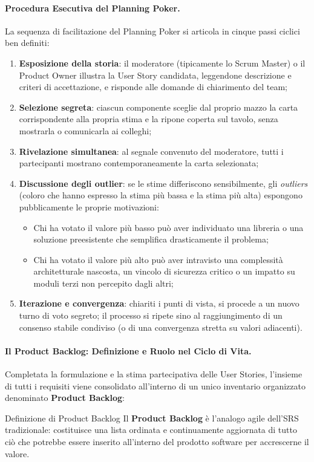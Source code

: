 \documentclass[12pt]{extarticle}
\begin{document}
\paragraph{Procedura Esecutiva del Planning Poker.}
La sequenza di facilitazione del Planning Poker si articola in cinque passi ciclici ben definiti:
\begin{enumerate}
    \item \textbf{Esposizione della storia}: il moderatore (tipicamente lo Scrum Master) o il Product Owner illustra la User Story candidata, leggendone descrizione e criteri di accettazione, e risponde alle domande di chiarimento del team;
    \item \textbf{Selezione segreta}: ciascun componente sceglie dal proprio mazzo la carta corrispondente alla propria stima e la ripone coperta sul tavolo, senza mostrarla o comunicarla ai colleghi;
    \item \textbf{Rivelazione simultanea}: al segnale convenuto del moderatore, tutti i partecipanti mostrano contemporaneamente la carta selezionata;
    \item \textbf{Discussione degli outlier}: se le stime differiscono sensibilmente, gli \textit{outliers} (coloro che hanno espresso la stima più bassa e la stima più alta) espongono pubblicamente le proprie motivazioni:
    \begin{itemize}
        \item Chi ha votato il valore più basso può aver individuato una libreria o una soluzione preesistente che semplifica drasticamente il problema;
        \item Chi ha votato il valore più alto può aver intravisto una complessità architetturale nascosta, un vincolo di sicurezza critico o un impatto su moduli terzi non percepito dagli altri;
    \end{itemize}
    \item \textbf{Iterazione e convergenza}: chiariti i punti di vista, si procede a un nuovo turno di voto segreto; il processo si ripete sino al raggiungimento di un consenso stabile condiviso (o di una convergenza stretta su valori adiacenti).
\end{enumerate}

\paragraph{Il Product Backlog: Definizione e Ruolo nel Ciclo di Vita.}
Completata la formulazione e la stima partecipativa delle User Stories, l'insieme di tutti i requisiti viene consolidato all'interno di un unico inventario organizzato denominato \textbf{Product Backlog}:
\begin{cbox}{Definizione di Product Backlog}
\noindent Il \textbf{Product Backlog} è l'analogo agile dell'SRS tradizionale: costituisce una lista ordinata e continuamente aggiornata di tutto ciò che potrebbe essere inserito all'interno del prodotto software per accrescerne il valore.
\end{cbox}
\end{document}
